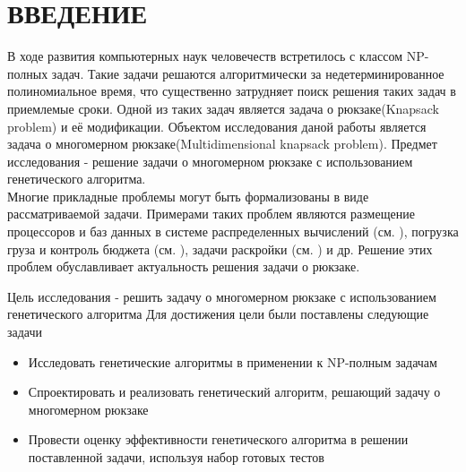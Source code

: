 \chapter*{ВВЕДЕНИЕ}
В ходе развития компьютерных наук человечеств встретилось с классом NP-полных задач. Такие задачи решаются алгоритмически за недетерминированное полиномиальное время, что существенно затрудняет поиск решения таких задач в приемлемые сроки.
 Одной из таких задач является задача о рюкзаке(Knapsack problem) и её модификации.
 Объектом исследования даной работы является задача о многомерном рюкзаке(Multidimensional knapsack problem).
 Предмет исследования - решение задачи о многомерном рюкзаке с использованием генетического алгоритма.
\\Многие прикладные проблемы могут быть формализованы в виде рассматриваемой задачи. Примерами таких проблем являются размещение процессоров
и баз данных в системе распределенных вычислений (см. \cite{Гэвиш1982}), погрузка груза и контроль бюджета (см. \cite{Ших1979}), задачи раскройки (см. \cite{Гилмор1966}) и др. 
Решение этих проблем обуславливает актуальность решения задачи о рюкзаке.

Цель исследования - решить задачу о многомерном рюкзаке с использованием генетического алгоритма
Для достижения цели были поставлены следующие задачи
\begin{itemize}
\item Исследовать генетические алгоритмы в применении к NP-полным задачам
\item Спроектировать и реализовать генетический алгоритм, решающий задачу о многомерном рюкзаке
\item Провести оценку эффективности генетического алгоритма в решении поставленной задачи, используя набор готовых тестов
\end{itemize} 
